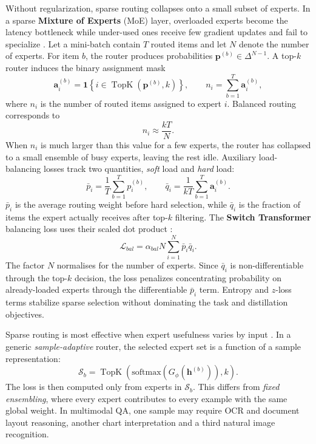 Without regularization, sparse routing collapses onto a small subset of
experts. In a sparse \textbf{Mixture of Experts} (MoE) layer, overloaded experts
become the latency bottleneck while under-used ones receive few gradient
updates and fail to specialize
\cite{shazeer2017outrageouslylargeneuralnetworks,lepikhin2020gshard,zhou2022mixtureofexpertswithexpertchoice}.
Let a mini-batch contain \(T\) routed items and let \(N\) denote the number of
experts. For item \(b\), the router produces probabilities
\(\mathbf{p}^{(b)}\in\Delta^{N-1}\). A top-\(k\) router induces the binary
assignment mask
\begin{equation}
\mathbf{a}^{(b)}_i
=
\mathbf{1}\!\left\{
i\in \operatorname{TopK}\!\left(\mathbf{p}^{(b)},k\right)
\right\},
\qquad
n_i
=
\sum_{b=1}^{T}\mathbf{a}^{(b)}_i ,
\end{equation}
where \(n_i\) is the number of routed items assigned to expert \(i\). Balanced
routing corresponds to
\[
n_i\approx \frac{kT}{N}.
\]
When \(n_i\) is much larger than this value for a few experts, the router has
collapsed to a small ensemble of busy experts, leaving the rest idle. Auxiliary load-balancing losses track two quantities, \textit{soft} load and
\textit{hard} load:
\begin{equation}
\bar{p}_i
=
\frac{1}{T}\sum_{b=1}^{T}p_i^{(b)},
\qquad
\bar{q}_i
=
\frac{1}{kT}\sum_{b=1}^{T}\mathbf{a}^{(b)}_i .
\label{eq:prelim-soft-hard-load}
\end{equation}
\(\bar{p}_i\) is the average routing weight before hard selection, while
\(\bar{q}_i\) is the fraction of items the expert actually receives after
top-\(k\) filtering. The \textbf{Switch Transformer}
balancing loss uses their scaled dot product
\cite{fedus2022switchtransformersscalingtrillion}:
\begin{equation}
\mathcal{L}_{bal}
=
\alpha_{bal}N\sum_{i=1}^{N}\bar{p}_i\bar{q}_i .
\label{eq:prelim-switch-load-balance}
\end{equation}
The factor \(N\) normalises for the number of experts. Since \(\bar{q}_i\) is
non-differentiable through the top-\(k\) decision, the loss penalizes
concentrating probability on already-loaded experts through the differentiable
\(\bar{p}_i\) term. Entropy and \(z\)-loss terms stabilize sparse selection without dominating
the task and distillation objectives.

Sparse routing is most effective when expert usefulness varies by input
\cite{shazeer2017outrageouslylargeneuralnetworks,fedus2022switchtransformersscalingtrillion}.
In a generic \textit{sample-adaptive} router, the selected expert set is a function of a
sample representation:
\begin{equation}
\mathcal{S}_b
=
\operatorname{TopK}
\left(
\mathrm{softmax}(G_{\phi}(\mathbf{h}^{(b)})), k
\right).
\end{equation}
The loss is then computed only from experts in \(\mathcal{S}_b\). This
differs from \textit{fixed ensembling}, where every expert contributes to every example
with the same global weight. In multimodal QA, one sample may require OCR and document layout reasoning,
another chart interpretation and a third natural image recognition.

